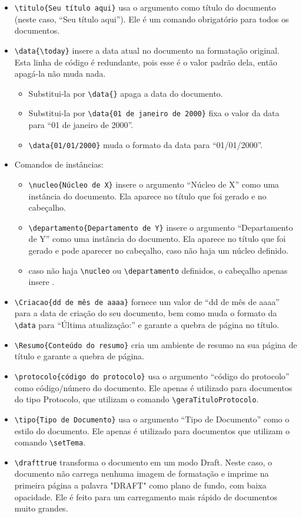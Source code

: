 \documentclass[brazilian, 11pt, oneside, a4paper]{article}
\begin{document}
\begin{itemize}
    \item \verb$\titulo{Seu título aqui}$ usa o argumento como título do documento (neste caso, ``Seu título aqui''). Ele é um comando obrigatório para todos os documentos.
    \item \verb$\data{\today}$ insere a data atual no documento na formatação original. Esta linha de código é redundante, pois esse é o valor padrão dela, então apagá-la não muda nada.
    \begin{itemize}
        \item Substitui-la por \verb$\data{}$ apaga a data do documento.
        \item Substitui-la por \verb$\data{01 de janeiro de 2000}$ fixa o valor da data para ``01 de janeiro de 2000''.
        \item \verb$\data{01/01/2000}$ muda o formato da data para ``01/01/2000''.
    \end{itemize}
    \item Comandos de instâncias:    
    \begin{itemize}
        \item \verb$\nucleo{Núcleo de X}$ insere o argumento ``Núcleo de X'' como uma instância do documento. Ela aparece no título que foi gerado e no cabeçalho.
        \item \verb$\departamento{Departamento de Y}$ insere o argumento ``Departamento de Y'' como uma instância do documento. Ela aparece no título que foi gerado e pode aparecer no cabeçalho, caso não haja um núcleo definido.
        \item caso não haja \verb$\nucleo$ ou \verb$\departamento$ definidos, o cabeçalho apenas insere \Zenith.
    \end{itemize}
    \item \verb$\Criacao{dd de mês de aaaa}$ fornece um valor de ``dd de mês de aaaa'' para a data de criação do seu documento, bem como muda o formato da \verb$\data$ para ``Última atualização:'' e garante a quebra de página no título.
    \item \verb$\Resumo{Conteúdo do resumo}$ cria um ambiente de resumo na sua página de título e garante a quebra de página.
    \item \verb$\protocolo{código do protocolo}$ usa o argumento ``código do protocolo'' como código/número do documento. Ele apenas é utilizado para documentos do tipo Protocolo, que utilizam o comando \verb$\geraTituloProtocolo$.
    \item \verb$\tipo{Tipo de Documento}$ usa o argumento ``Tipo de Documento'' como o estilo do documento. Ele apenas é utilizado para documentos que utilizam o comando \verb$\setTema$.
    \item \verb$\drafttrue$ transforma o documento em um modo Draft. Neste caso, o documento não carrega nenhuma imagem de formatação e imprime na primeira página a palavra "DRAFT" como plano de fundo, com baixa opacidade. Ele é feito para um carregamento mais rápido de documentos muito grandes.

\end{itemize}
\end{document}
